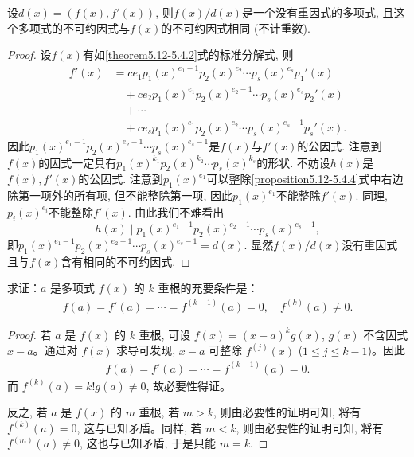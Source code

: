\documentclass[../../main.tex]{subfiles}%
\begin{document}
\begin{theorem}\label{theorem:多项式除去与其导数的最大公因式就能消去重因式}
设\(d(x)=(f(x),f'(x))\), 则\(f(x)/d(x)\)是一个没有重因式的多项式, 且这个多项式的不可约因式与\(f(x)\)的不可约因式相同 (不计重数).
\end{theorem}
\begin{proof}
设\(f(x)\)有如\eqref{theorem5.12-5.4.2}式的标准分解式, 则
\begin{align}
f'(x)&=ce_1p_1(x)^{e_1 - 1}p_2(x)^{e_2}\cdots p_s(x)^{e_s}p_1'(x) \nonumber \\
&\quad +ce_2p_1(x)^{e_1}p_2(x)^{e_2 - 1}\cdots p_s(x)^{e_s}p_2'(x) \nonumber \\
&\quad +\cdots \nonumber \\
&\quad +ce_sp_1(x)^{e_1}p_2(x)^{e_2}\cdots p_s(x)^{e_s - 1}p_s'(x).\label{proposition5.12-5.4.4}
\end{align}
因此\(p_1(x)^{e_1 - 1}p_2(x)^{e_2 - 1}\cdots p_s(x)^{e_s - 1}\)是\(f(x)\)与\(f'(x)\)的公因式. 注意到\(f(x)\)的因式一定具有\(p_1(x)^{k_1}p_2(x)^{k_2}\cdots p_s(x)^{k_s}\)的形状. 不妨设\(h(x)\)是\(f(x),f'(x)\)的公因式. 注意到\(p_1(x)^{e_1}\)可以整除\eqref{proposition5.12-5.4.4}式中右边除第一项外的所有项, 但不能整除第一项, 因此\(p_1(x)^{e_1}\)不能整除\(f'(x)\). 同理, \(p_i(x)^{e_i}\)不能整除\(f'(x)\). 由此我们不难看出
\[
h(x)\mid p_1(x)^{e_1 - 1}p_2(x)^{e_2 - 1}\cdots p_s(x)^{e_s - 1},
\]
即\(p_1(x)^{e_1 - 1}p_2(x)^{e_2 - 1}\cdots p_s(x)^{e_s - 1}=d(x)\). 显然\(f(x)/d(x)\)没有重因式且与\(f(x)\)含有相同的不可约因式.
\end{proof}

\begin{proposition}[多项式有k重根的充要条件]\label{proposition:多项式有k重根的充要条件}
求证：$a$ 是多项式 $f(x)$ 的 $k$ 重根的充要条件是：
\begin{align*}
f(a) = f'(a) = \cdots = f^{(k-1)}(a) = 0, \quad f^{(k)}(a) \neq 0.
\end{align*}
\end{proposition}
\begin{proof}
若 $a$ 是 $f(x)$ 的 $k$ 重根, 可设 $f(x) = (x - a)^k g(x)$, $g(x)$ 不含因式 $x - a$。通过对 $f(x)$ 求导可发现, $x - a$ 可整除 $f^{(j)}(x)$ ($1 \leqslant  j \leqslant  k - 1$)。因此
\begin{align*}
f(a) = f'(a) = \cdots = f^{(k-1)}(a) = 0.
\end{align*}
而 $f^{(k)}(a) = k! g(a) \neq 0$, 故必要性得证。

反之, 若 $a$ 是 $f(x)$ 的 $m$ 重根, 若 $m > k$, 则由必要性的证明可知, 将有 $f^{(k)}(a) = 0$, 这与已知矛盾。同样, 若 $m < k$, 则由必要性的证明可知, 将有 $f^{(m)}(a) \neq 0$, 这也与已知矛盾, 于是只能 $m = k$.
\end{proof}
\end{document}
